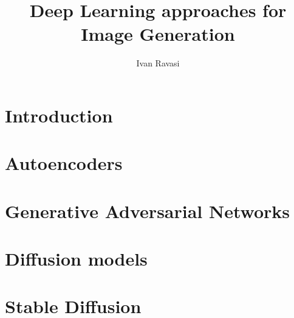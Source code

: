 \documentclass{beamer}
\title[Image generation through DL]{Deep Learning approaches for Image Generation}
\author[I. Ravasi]{Ivan Ravasi}
\begin{document}
    \frame{\titlepage}
    \section{Introduction}
    
    \section{Autoencoders}
    
    \section{Generative Adversarial Networks}
    
    \section{Diffusion models}
    
    \section{Stable Diffusion}
    
\end{document}
